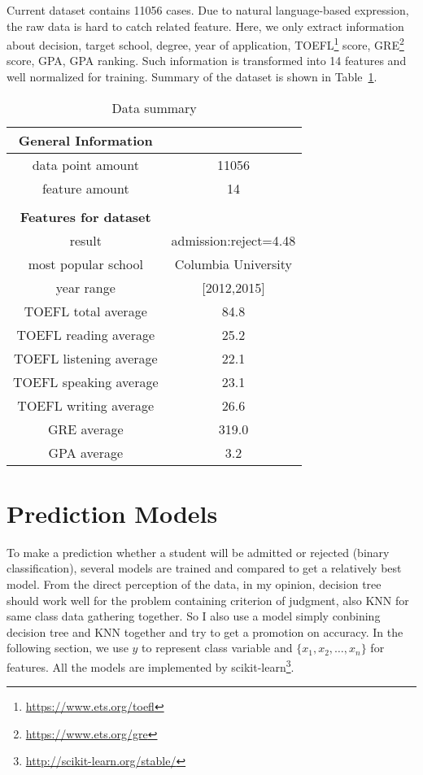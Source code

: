 \documentclass{article}
\begin{document}
Current dataset contains 11056 cases. Due to natural language-based expression, the raw data is hard to catch related feature. Here, we only extract information about decision, target school, degree, year of application, TOEFL\footnote{\url{https://www.ets.org/toefl}} score, GRE\footnote{\url{https://www.ets.org/gre}} score, GPA, GPA ranking. Such information is transformed into 14 features and well normalized for training. Summary of the dataset is shown in Table~\ref{tab: Data_summary}.

\begin{table}[htbp]

\centering
    \begin{tabular}{cc}
        \textbf{General Information}\\
        \hline
        data point amount & 11056\\
        feature amount & 14\\
        \hline\\
        \textbf{Features for dataset}\\
        \hline
        result & admission:reject=4.48\\
        most popular school & Columbia University\\
        year range & [2012,2015]\\
        TOEFL total average & 84.8\\
        TOEFL reading average & 25.2\\
        TOEFL listening average & 22.1\\
        TOEFL speaking average & 23.1\\
        TOEFL writing average & 26.6\\
        GRE average & 319.0\\
        GPA average & 3.2\\
        \hline
    \end{tabular}

\caption{Data summary}
\label{tab: Data_summary}
\end{table}

\section{Prediction Models}

To make a prediction whether a student will be admitted or rejected (binary classification), several models are trained and compared to get a relatively best model. From the direct perception of the data, in my opinion, decision tree should work well for the problem containing criterion of judgment, also KNN for same class data gathering together. So I also use a model simply conbining decision tree and KNN together and try to get a promotion on accuracy. In the following section, we use $y$ to represent class variable and $\{x_1,x_2,\dots, x_n\}$ for features. All the models are implemented by scikit-learn\footnote{\url{http://scikit-learn.org/stable/}}.
\end{document}
